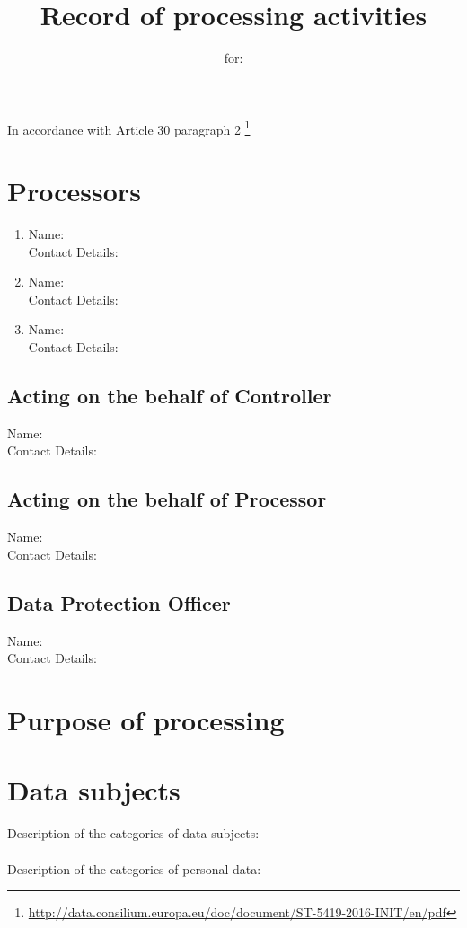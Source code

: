 \documentclass[11pt]{article}
\title{\textbf{Record of processing activities}}
\author{for: }
\date{}
\begin{document}
\maketitle
In accordance with Article 30 paragraph 2 \footnote{\url{http://data.consilium.europa.eu/doc/document/ST-5419-2016-INIT/en/pdf}}
\section{Processors}
\begin{enumerate}
  \item Name:\\
Contact Details:\\
  \item Name:\\
Contact Details:\\
  \item Name:\\
Contact Details:\\
\end{enumerate}


\subsection*{Acting on the behalf of Controller}
Name:\\
Contact Details:\\

\subsection*{Acting on the behalf of Processor}
Name:\\
Contact Details:\\

\subsection*{Data Protection Officer}
Name:\\
Contact Details:\\
\section{Purpose of processing}

\section{Data subjects}
Description of the categories of data subjects:\\
\\
Description of the categories of personal data:\\
\end{document}
